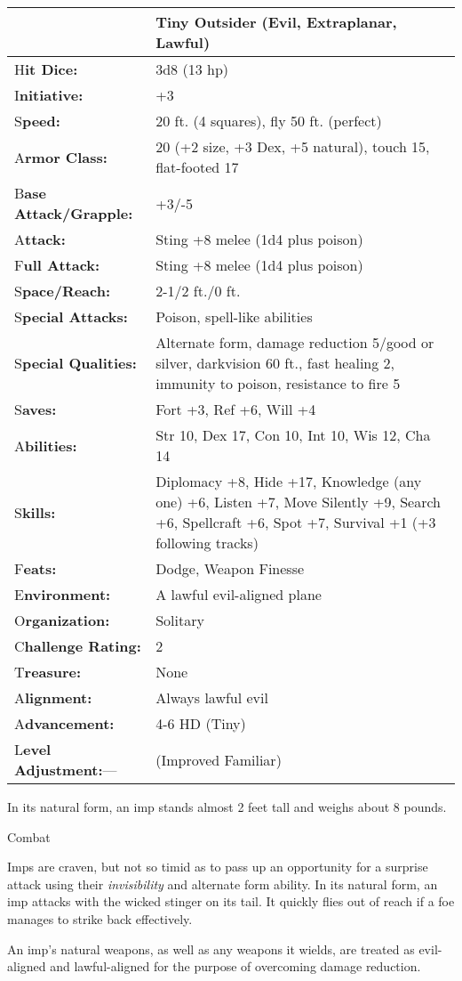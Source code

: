 \documentclass{article}
\begin{document}
\begin{tabular}{|>{\raggedright}p{91pt}|>{\raggedright}p{231pt}|}
\hline
  & Tiny Outsider (Evil, Extraplanar, Lawful)\tabularnewline
\hline
H\textbf{it Dice:} & 3d8 (13 hp)\tabularnewline
\hline
I\textbf{nitiative:} & +3\tabularnewline
\hline
S\textbf{peed:} & 20 ft. (4 squares), fly 50 ft. (perfect)\tabularnewline
\hline
A\textbf{rmor Class:} & 20 (+2 size, +3 Dex, +5 natural), touch 15, flat-footed 
17\tabularnewline
\hline
B\textbf{ase Attack/Grapple:} & +3/-5\tabularnewline
\hline
A\textbf{ttack:} & Sting +8 melee (1d4 plus poison)\tabularnewline
\hline
F\textbf{ull Attack:} & Sting +8 melee (1d4 plus poison)\tabularnewline
\hline
S\textbf{pace/Reach:} & 2-1/2 ft./0 ft.\tabularnewline
\hline
S\textbf{pecial Attacks:} & Poison, spell-like abilities\tabularnewline
\hline
S\textbf{pecial Qualities:} & Alternate form, damage reduction 5/good or silver, 
darkvision 60 ft., fast healing 2, immunity to poison, resistance to fire 5\tabularnewline
\hline
S\textbf{aves:} & Fort +3, Ref +6, Will +4\tabularnewline
\hline
A\textbf{bilities:} & Str 10, Dex 17, Con 10, Int 10, Wis 12, Cha 14\tabularnewline
\hline
S\textbf{kills:} & Diplomacy +8, Hide +17, Knowledge (any one) +6, Listen +7, Move 
Silently +9, Search +6, Spellcraft +6, Spot +7, Survival +1 (+3 following tracks)\tabularnewline
\hline
F\textbf{eats:} & Dodge, Weapon Finesse\tabularnewline
\hline
E\textbf{nvironment:} & A lawful evil-aligned plane\tabularnewline
\hline
O\textbf{rganization:} & Solitary\tabularnewline
\hline
C\textbf{hallenge Rating:} & 2\tabularnewline
\hline
T\textbf{reasure:} & None\tabularnewline
\hline
A\textbf{lignment:} & Always lawful evil\tabularnewline
\hline
A\textbf{dvancement:} & 4-6 HD (Tiny)\tabularnewline
\hline
L\textbf{evel Adjustment:}--- &  (Improved Familiar)\tabularnewline
\hline
\end{tabular}

In its natural form, an imp stands almost 2 feet tall and weighs about 8 pounds.

Combat

Imps are craven, but not so timid as to pass up an opportunity for a surprise attack 
using their \textit{invisibility }and alternate form ability. In its natural form, 
an imp attacks with the wicked stinger on its tail. It quickly flies out of reach 
if a foe manages to strike back effectively.

An imp's natural weapons, as well as any weapons it wields, are treated as evil-aligned 
and lawful-aligned for the purpose of overcoming damage reduction.
\end{document}
